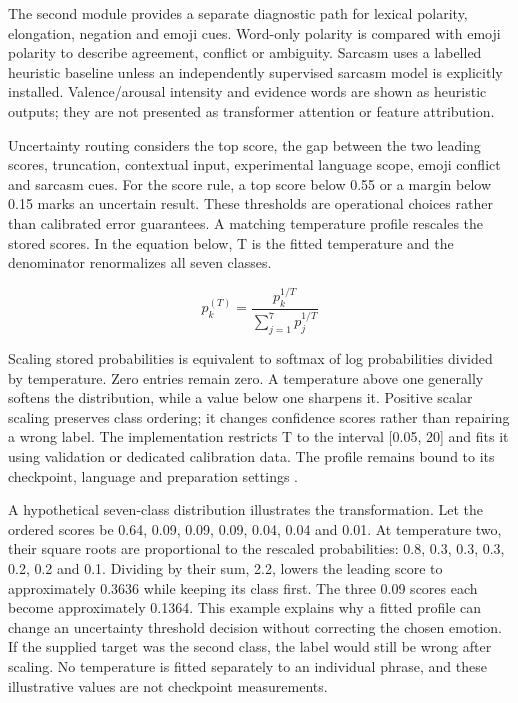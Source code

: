 \documentclass[journal]{IEEEtran}
\begin{document}
The second module provides a separate diagnostic path for lexical polarity, elongation, negation and emoji cues. Word-only polarity is compared with emoji polarity to describe agreement, conflict or ambiguity. Sarcasm uses a labelled heuristic baseline unless an independently supervised sarcasm model is explicitly installed. Valence/arousal intensity and evidence words are shown as heuristic outputs; they are not presented as transformer attention or feature attribution.

Uncertainty routing considers the top score, the gap between the two leading scores, truncation, contextual input, experimental language scope, emoji conflict and sarcasm cues. For the score rule, a top score below 0.55 or a margin below 0.15 marks an uncertain result. These thresholds are operational choices rather than calibrated error guarantees. A matching temperature profile rescales the stored scores. In the equation below, T is the fitted temperature and the denominator renormalizes all seven classes.

\begin{equation}
p_k^{(T)}=\frac{p_k^{1/T}}{\sum_{j=1}^{7}p_j^{1/T}}
\label{eq:temperature}
\end{equation}

Scaling stored probabilities is equivalent to softmax of log probabilities divided by temperature. Zero entries remain zero. A temperature above one generally softens the distribution, while a value below one sharpens it. Positive scalar scaling preserves class ordering; it changes confidence scores rather than repairing a wrong label. The implementation restricts T to the interval [0.05, 20] and fits it using validation or dedicated calibration data. The profile remains bound to its checkpoint, language and preparation settings \cite{guo2017}.

A hypothetical seven-class distribution illustrates the transformation. Let the ordered scores be 0.64, 0.09, 0.09, 0.09, 0.04, 0.04 and 0.01. At temperature two, their square roots are proportional to the rescaled probabilities: 0.8, 0.3, 0.3, 0.3, 0.2, 0.2 and 0.1. Dividing by their sum, 2.2, lowers the leading score to approximately 0.3636 while keeping its class first. The three 0.09 scores each become approximately 0.1364. This example explains why a fitted profile can change an uncertainty threshold decision without correcting the chosen emotion. If the supplied target was the second class, the label would still be wrong after scaling. No temperature is fitted separately to an individual phrase, and these illustrative values are not checkpoint measurements.
\end{document}
